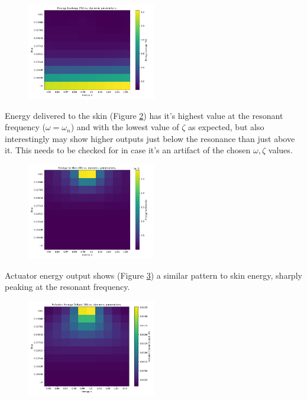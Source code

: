 \documentclass[letterpaper,11pt]{article}
\begin{document}
\begin{figure}
\includegraphics[width=0.5\textwidth]{heatmapleakage_10x10.png}
\caption{}\label{EleakFig}
\end{figure}


Energy delivered to the skin (Figure \ref{SkinEFig}) has it's highest value at the resonant
frequency ($\omega=\omega_n$) and with the lowest value of
$\zeta$ as expected, but also interestingly may show higher outputs
just below the resonance than just above it.   This needs to be checked
for in case it's an artifact of the chosen $\omega, \zeta$ values.


\begin{figure}
\includegraphics[width=0.5\textwidth]{heatmap_SkinE_10x10.png}
\caption{}\label{SkinEFig}
\end{figure}

Actuator energy output shows (Figure \ref{EoutFig}) a similar pattern to skin energy,
sharply peaking at the resonant frequency.


\begin{figure}
\includegraphics[width=0.5\textwidth]{heatmap_actOutput_10x10.png}
\caption{}\label{EoutFig}
\end{figure}
\end{document}
